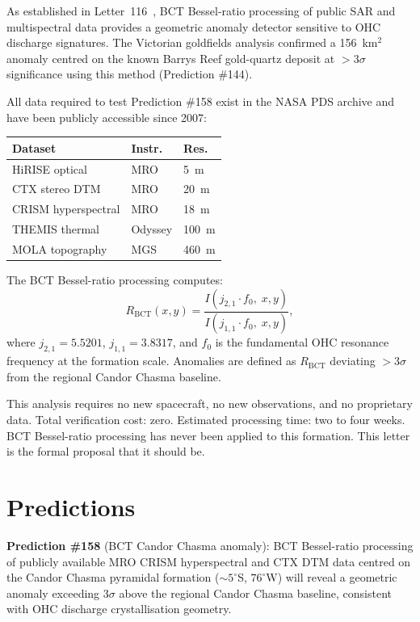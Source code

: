 \documentclass[12pt,twocolumn]{article}
\begin{document}
As established in Letter~116~\cite{BCT_L116}, BCT Bessel-ratio
processing of public SAR and multispectral data provides a geometric
anomaly detector sensitive to OHC discharge signatures. The
Victorian goldfields analysis confirmed a 156~km$^2$ anomaly centred
on the known Barrys Reef gold-quartz deposit at $>3\sigma$
significance using this method (Prediction \#144).

All data required to test Prediction \#158 exist in the NASA PDS
archive and have been publicly accessible since 2007:

\begin{center}
{\small
\begin{tabular}{@{}p{2.4cm}p{1.6cm}p{1.2cm}@{}}
\toprule
Dataset & Instr. & Res. \\
\midrule
HiRISE optical & MRO & 5~m \\
CTX stereo DTM & MRO & 20~m \\
CRISM hyperspectral & MRO & 18~m \\
THEMIS thermal & Odyssey & 100~m \\
MOLA topography & MGS & 460~m \\
\bottomrule
\end{tabular}}
\end{center}

\medskip
The BCT Bessel-ratio processing computes:
\begin{equation}
  R_{\mathrm{BCT}}(x,y)
  = \frac{I(j_{2,1}\cdot f_0,\;x,y)}{I(j_{1,1}\cdot f_0,\;x,y)},
\end{equation}
where $j_{2,1}=5.5201$, $j_{1,1}=3.8317$, and $f_0$ is the
fundamental OHC resonance frequency at the formation scale.
Anomalies are defined as $R_{\mathrm{BCT}}$ deviating $>3\sigma$
from the regional Candor Chasma baseline.

This analysis requires no new spacecraft, no new observations,
and no proprietary data. Total verification cost: zero. Estimated
processing time: two to four weeks. BCT Bessel-ratio processing
has never been applied to this formation. This letter is the
formal proposal that it should be.

\section{Predictions}

\noindent\textbf{Prediction \#158} (BCT Candor Chasma anomaly):
BCT Bessel-ratio processing of publicly available MRO CRISM
hyperspectral and CTX DTM data centred on the Candor Chasma
pyramidal formation (${\sim}5^\circ$S, $76^\circ$W) will reveal
a geometric anomaly exceeding $3\sigma$ above the regional
Candor Chasma baseline, consistent with OHC discharge
crystallisation geometry.
\end{document}

